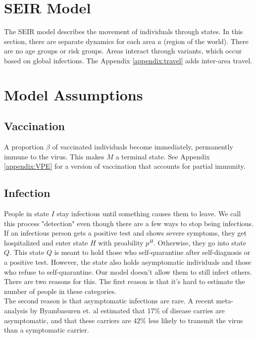 \documentclass{article}
\begin{document}
\section{SEIR Model}
The SEIR model describes the movement of individuals through states. In this section, there are separate dynamics for each area $a$ (region of the world). There are no age groups or risk groups. Areas interact through variants, which occur based on global infections. The Appendix \ref{appendix:travel} adds inter-area travel.\\
\section{Model Assumptions}
    \subsection{Vaccination} A proportion $\beta$ of vaccinated individuals become immediately, permanently immune to the virus. This makes $M$ a terminal state. See Appendix \ref{appendix:VPE} for a version of vaccination that accounts for partial immunity.
        
     \subsection{Infection}  People in state $I$ stay infectious until something causes them to leave. We call this process "detection" even though there are a few ways to stop being infectious. If an infectious person gets a positive test and shows severe symptoms, they get hospitalized and enter state $H$ with proability $p^H$. Otherwise, they go into state $Q$. This state $Q$ is meant to hold those who self-quarantine after self-diagnosis or a positive test. However, the state also holds asymptomatic individuals and those who refuse to self-quarantine. Our model doesn't allow them to still infect others.\\
     There are two reasons for this. The first reason is that it's hard to estimate the number of people in these categories.\\
     The second reason is that asymptomatic infections are rare. A recent meta-analysis by Byambasuren et. al \cite{Byam} estimated that 17\% of disease carries are asymptomatic, and that these carriers are 42\% less likely to transmit the virus than a symptomatic carrier.
     
     
\end{document}
